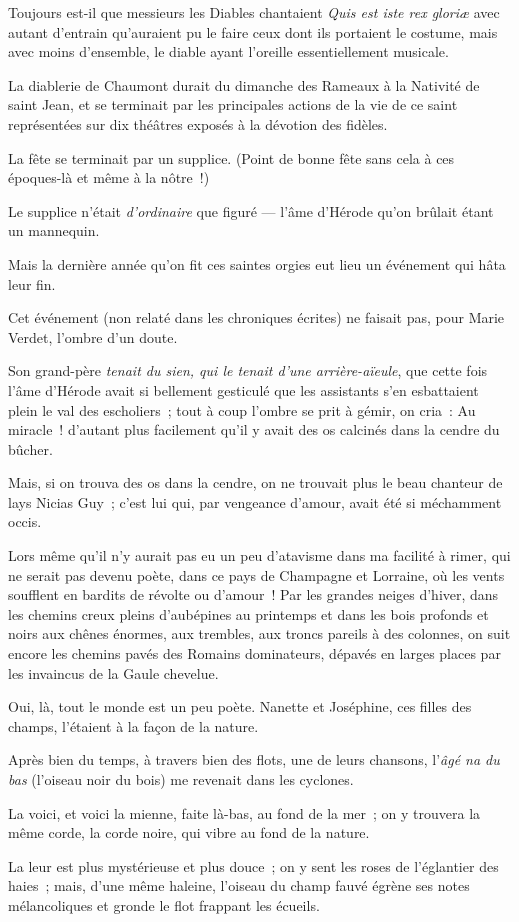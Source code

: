 \documentclass[french,twoside]{book} %
\begin{document}
\noindent Toujours est-il que messieurs les Diables chantaient \emph{Quis est iste rex gloriæ} avec autant d’entrain qu’auraient pu le faire ceux dont ils portaient le costume, mais avec moins d’ensemble, le diable ayant l’oreille essentiellement musicale.\par
La diablerie de Chaumont durait du dimanche des Rameaux à la Nativité de saint Jean, et se terminait par les principales actions de la vie de ce saint représentées sur dix théâtres exposés à la dévotion des fidèles.\par
La fête se terminait par un supplice. (Point de bonne fête sans cela à ces époques-là et même à la nôtre !)\par
Le supplice n’était \emph{d’ordinaire} que figuré — l’âme d’Hérode qu’on brûlait étant un mannequin.\par
Mais la dernière année qu’on fit ces saintes orgies eut lieu un événement qui hâta leur fin.\par
 Cet événement (non relaté dans les chroniques écrites) ne faisait pas, pour Marie Verdet, l’ombre d’un doute.\par
Son grand-père \emph{tenait du sien, qui le tenait d’une arrière-aïeule}, que cette fois l’âme d’Hérode avait si bellement gesticulé que les assistants s’en esbattaient plein le val des escholiers ; tout à coup l’ombre se prit à gémir, on cria : Au miracle ! d’autant plus facilement qu’il y avait des os calcinés dans la cendre du bûcher.\par
Mais, si on trouva des os dans la cendre, on ne trouvait plus le beau chanteur de lays Nicias Guy ; c’est lui qui, par vengeance d’amour, avait été si méchamment occis.\par
Lors même qu’il n’y aurait pas eu un peu d’atavisme dans ma facilité à rimer, qui ne serait pas devenu poète, dans ce pays de Champagne et Lorraine, où les vents soufflent en bardits de révolte ou d’amour ! Par les grandes neiges d’hiver, dans les chemins creux pleins d’aubépines au printemps et dans les bois profonds et noirs aux chênes énormes, aux trembles, aux troncs pareils à des colonnes, on suit encore les chemins pavés des Romains dominateurs, dépavés en larges places par les invaincus de la Gaule chevelue.\par
Oui, là, tout le monde est un peu poète. Nanette  et Joséphine, ces filles des champs, l’étaient à la façon de la nature.\par
Après bien du temps, à travers bien des flots, une de leurs chansons, l’\emph{âgé na du bas} (l’oiseau noir du bois) me revenait dans les cyclones.\par
La voici, et voici la mienne, faite là-bas, au fond de la mer ; on y trouvera la même corde, la corde noire, qui vibre au fond de la nature.\par
La leur est plus mystérieuse et plus douce ; on y sent les roses de l’églantier des haies ; mais, d’une même haleine, l’oiseau du champ fauvé égrène ses notes mélancoliques et gronde le flot frappant les écueils.\par
\end{document}
